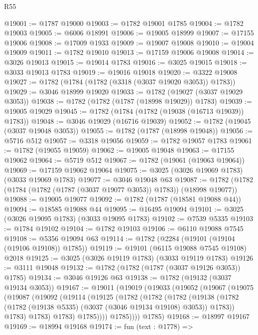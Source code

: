 \begin{lexlean}{R55}
\begin{coremodule}
@19001 := @1787 @19000
@19003 := @1782 @19001 @1785
@19004 := @1782 @19003
@19005 := @6006 @18991
@19006 := @19005 @18999
@19007 := @17155 @19006
@19008 := @17009 @1933
@19009 := @19007 @19008
@19010 := @19004 @19009
@19011 := @1782 @19010
@19013 := @17159 @19006 @19008
@19014 := @3026 @19013
@19015 := @19014 @1783
@19016 := @3025 @19015
@19018 := @3033 @19013 @1783
@19019 := @19016 @19018
@19020 := @3322 @19008
@19027 := @1782 (@1784 (@1782 (@3318 (@3037 @19020 @3053)) @1783))
@19029 := @3046 @18999 @19020
@19033 := @1782 (@19027 (@3037 @19029 @3053))
@19038 := @1782 (@1782 (@1787 (@18998 @19029)) @1783)
@19039 := @19005 @19029
@19045 := @1782 (@1784 (@1782 (@19038 (@16713 @19039)) @1783))
@19048 := @3046 @19029 (@16716 @19039)
@19052 := @1782 (@19045 (@3037 @19048 @3053))
@19055 := @1782 (@1787 (@18998 @19048))
@19056 := @5716 @512
@19057 := @3318 @19056
@19059 := @1782 @19057 @1783
@19061 := @1782 (@19055 @19059)
@19062 := @19005 @19048
@19063 := @17155 @19062
@19064 := @5719 @512
@19067 := @1782 (@19061 (@19063 @19064))
@19069 := @17159 @19062 @19064
@19075 := @3025 (@3026 @19069 @1783) (@3033 @19069 @1783)
@19077 := @3046 @19048 @63
@19087 := @1782 (@1782 (@1784 (@1782 (@1787 (@3037 @19077 @3053)) @1783)) (@18998 @19077))
@19088 := @19005 @19077
@19092 := @1782 (@1787 (@18581 @19088 @44))
@19094 := @18585 @19088 @44
@19095 := @16495 @19094
@19101 := @3025 (@3026 @19095 @1783) (@3033 @19095 @1783)
@19102 := @7539 @5335
@19103 := @1784 @19102
@19104 := @1782 @19103
@19106 := @6110 @19088 @7545
@19108 := @5356 @19094 @63
@19114 := @1782 (@2284 (@19101 (@19104 (@19106 @19108)) @1785))
@19119 := @19101 (@6115 @19088 @7545 @19108) @2018
@19125 := @3025 (@3026 @19119 @1783) (@3033 @19119 @1783)
@19126 := @3111 @19048
@19132 := @1782 (@1782 (@1787 (@3037 @19126 @3053)) @1785)
@19134 := @3046 @19126 @63
@19138 := @1782 (@19132 (@3037 @19134 @3053))
@19167 := @19011
    (@19019
      (@19033
        (@19052
          (@19067
            (@19075
              (@19087
                (@19092
                  (@19114
                    (@19125
                      (@1782
                        (@1782
                          (@1782
                            (@19138
                              (@1782
                                (@1782 (@19138 @5335) (@3037 (@3046 @19134 @19108) @3053))
                                @1783))
                            @1783)
                          @1783)
                        @1783)
                      @1785))))
              @1785))))
      @1785)
@19168 := @18997 @19167
@19169 := @18994 @19168
@19174 := fun (text : @1778) =>

\end{coremodule}
\end{lexlean}
